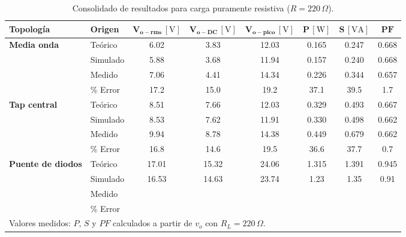 \begin{table}[!t]
\centering
\small
\caption{Consolidado de resultados para carga puramente resistiva ($R = 220\,\Omega$).}
\label{tab:consolidado_tabla1}
\begin{tabular}{llcccccc}
\toprule
\textbf{Topología} & \textbf{Origen} & $\mathbf{V_{o-rms}}\,\mathrm{[V]}$ & $\mathbf{V_{o-DC}}\,\mathrm{[V]}$ & $\mathbf{V_{o-pico}}\,\mathrm{[V]}$ & $\mathbf{P}\,\mathrm{[W]}$ & $\mathbf{S}\,\mathrm{[VA]}$ & $\mathbf{PF}$ \\
\midrule
\textbf{Media onda} 
& Teórico   & 6.02  & 3.83  & 12.03 & 0.165 & 0.247 & 0.668 \\
& Simulado  &5.88 %
& 3.68%
& 11.94%
& 0.157%
& 0.240%
& 0.668%
\\
& Medido    & 7.06 %
& 4.41
& 14.34
& 0.226
& 0.344
& 0.657
\\
& \% Error  & 17.2 %
& 15.0
& 19.2
& 37.1
& 39.5
& 1.7
\\
\midrule
\textbf{Tap central} 
& Teórico   & 8.51  & 7.66  & 12.03 & 0.329 & 0.493 & 0.667 \\
& Simulado  &8.53 %
& 7.62
& 11.91
& 0.330
& 0.498
& 0.662
\\
& Medido    & 9.94 %
& 8.78
& 14.38
& 0.449 %
& 0.679 %
& 0.662
\\
& \% Error  & 16.8
& 14.6
& 19.5
& 36.6
& 37.7
& 0.7
\\
\midrule
\textbf{Puente de diodos} 
& Teórico   & 17.01 & 15.32 & 24.06 & 1.315 & 1.391 & 0.945 \\
& Simulado  &16.53 %
& 14.63
& 23.74
& 1.23
& 1.35
& 0.91
\\
& Medido    & %
& 
& 
& 
& 
& 
\\
& \% Error  & 
& 
& 
& 
& 
&
\\
\bottomrule
\multicolumn{8}{l}{\footnotesize Valores medidos: $P$, $S$ y $PF$ calculados a partir de $v_o$ con $R_L = 220\,\Omega$.}
\end{tabular}
\end{table}

